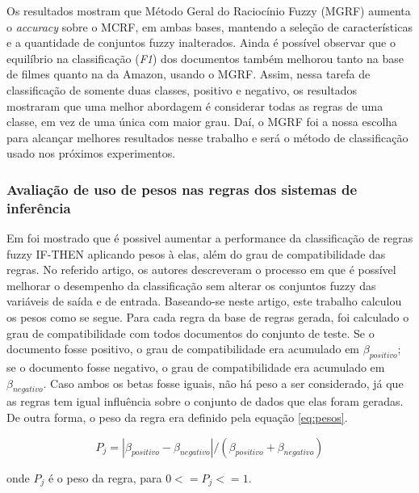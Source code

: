 Os resultados mostram que Método Geral do Raciocínio Fuzzy (MGRF) aumenta o \textit{accuracy} sobre o MCRF, em ambas bases,  mantendo a seleção de características e a quantidade de conjuntos fuzzy inalterados. Ainda é possível observar que o equilíbrio na classificação (\textit{F1}) dos documentos também melhorou tanto na base de filmes quanto na da Amazon, usando o MGRF.  Assim, nessa tarefa de classificação de somente duas classes, positivo e negativo, os resultados mostraram que uma melhor abordagem é considerar todas as regras de uma classe, em vez de uma única com maior grau. Daí, o MGRF foi a nossa escolha para alcançar melhores resultados nesse trabalho e será o método de classificação usado nos próximos experimentos. 

\subsubsection{Avaliação de uso de pesos nas regras dos sistemas de inferência}

Em \cite{ishibuchi2001effect} foi mostrado que é possivel aumentar a performance da classificação de regras fuzzy IF-THEN aplicando pesos à elas, além do grau de compatibilidade das regras. No referido artigo, os autores descreveram o processo em que é possível melhorar o desempenho da classificação sem alterar os conjuntos fuzzy das variáveis de saída e de entrada. Baseando-se neste artigo, este trabalho calculou os pesos como se segue. Para cada regra da base de regras gerada, foi calculado o grau de compatibilidade com todos documentos do conjunto de teste. Se o documento fosse positivo, o grau de compatibilidade era acumulado em $\beta_{positivo}$; se o documento fosse negativo, o grau de compatibilidade era acumulado em $\beta_{negativo}$. Caso ambos os betas fosse iguais, não há peso a ser considerado, já que as regras tem igual influência sobre o conjunto de dados que elas foram geradas. De outra forma, o peso da regra era definido pela equação \ref{eq:pesos}.

\begin{equation}
P_j = |\beta_{positivo} - \beta_{negativo}| / (\beta_{positivo} + \beta_{negativo})
\label{eq:pesos}
\end{equation}

onde $P_j$ é o peso da regra, para $0 <= P_j <= 1$. 

